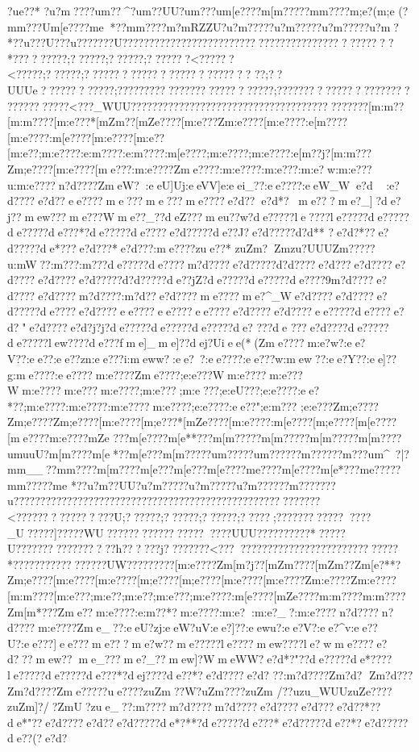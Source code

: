 {{{{{{{{{{{{{{{?u{e??*
?u?m????u{m??^?u{m??UU?u{m???u{m[e ????m[m?????m{m????{m;e  ?({m;e   (?m{m???U{m[e????{m{e*??m{m????{m?mRZZU?u?m?????u?m?????u?m?????u?m ?*?}?u???U???u???????}U??????}???????}???????????????????????????????????*?????????;??????;??????;???????<??????<?????;??????;??????????????????????????  ??;??UUUe????????????;???????????????????????????;?????????????????????????????????<???_WUU???}?????}?????}???????}???????}???????}??????}????[m:m??[m:m????[m:e???*[mZm??[mZe????[m:e???Zm:e????[m:e????:e[m????[m:e????:m[e????[m:e????[m:e??[m:e??;m:e????:e:m????:e:m????:m[e????;m:e????;m:e????:e[m??j?[m:m???Zm;e????[m:e????[me???:m:e????Zme????:m:e????:m:e???}:m:e?}w:m:e???u:m:e????n?d????ZmeW?:eeU]Uj:eeVV]e:eei_??:ee????:eeW_We?d :e?d????e?d??  ee????me???me???me????e?d?? e?d*?me???me?_]?de?j??mew???me???Wme??_??deZ???meu??w?de?????le????le?????de?????de?????de???*?de?????de????e?d?????de??J?e?d?????d?d**
?e?d?*??e?d?????de*???e?d???*e?d??? :me????zue??*
zuZm? Zmzu?UUUZm?} ????u:mW??:m?\??? :m?\???de?????de????m?d????e?d?????d?d????e?d???e?d????e?d????e?d????e?d?????d?d?????de??jZ?de?????de?????de????9m?d????e?d????e?d????m?d????:m?d??e?d????me????me?^_We?d????e?d????e?d?????de????e?d????ee????ee????ee????e?d????e?d????ee?????de????e?d? "e?d????e?d?j?j?de?????de?????de?????de?
???de
???e?d??? ?de?????de?????lew????de???fme}]}_me}}]??dej?Uiee(*(Zme????m:e?w?}:ee?V??:ee??:ee??zn:ee???i:meww?:ee?~?{:ee????:ee???w:mew??:ee?Y??:ee]??g:me????:ee????m:e????Zme????;e:e???Wm:e????m:e???Wm:e????m:e???m:e????;m:e???;m:e???;e:eU???;e:e????:ee?*??;m:e????:m:e????:m:e????m:e????;e:e????:ee??" ;e:m???
;e:e???Zm;e????Zm;e????Zm;e????[m:e????[m;e???*[mZe????[m:e????:m[e????[m;e????[m[e????[me????{m:e????{mZe
???{m[e????{m[e**???m[m?????m[m?????m[m?????m[m????{u{m}uuU?m[m????{m[e*??{m[e ???{m[m?????u{m?????u{m?????}?m?????}?m???u{m^~?|?m{m__??m{m????m[m????{m[e ???{m[e ???{m[e????{m{e????{m[e????{m[e*???{m{e?????m{m?????m{e  *??u?m??UU?u?m?????u?m?????u?m?????}?m???????u???????}???????????????????????????????????????}???????????<???????????????}?U;??????;??????;??????;?????;?????????}?????}??_U??}???]???}??WU??}??????}??????}???????UUU???}   ??}?????*??}???U???}??????????????h??????j????????<????????}??????????????????????}??*????}???????}??????}UW?????}????[m:e????Zm[m?j??[mZm????[mZm??Zm[e?**?Zm;e????[m:e????[m:e????[m;e????[m;e????[m:e????[m:e????Zm:e????Zm:e????[m:m????[m:e???;m:e??;m:e??;m:e???;m:e????:m[e????[mZe????{m:m????{m:m????Zm[m*???Zme??m:e????:e:m??*?m:e????:m:e?}:m:e?_?:m:e????n?d????n?d????m:e????Zme_??:eeU?zj:eeW?uV:ee?]??:eewu?:ee?V?:ee}?^v:ee??U?:ee???]ee??? me???me?w??me?????le????mew????le}?wme????e?d???mew??me_???me?_??mew]?Wme}WW?e?d*?"??de?????de*????le?????de?????de???*?dej????de??*?e?d????e?d?
??:m?d????Zm?d?
Zm?d??? Zm?d????Zme?????ue????zuZm??W?uZm????zuZm
/??{uzu_WUUzuZe????zuZm]?/?}ZmU?zue_??:m?\????m?d????m?d????e?d????e?d???e?d??*??de*"??e?d????e?d??e?d?????de*?**?de?????de???*e?d?????de??*?e?d?????de??(?e?d?

}}}}}}}}}}
